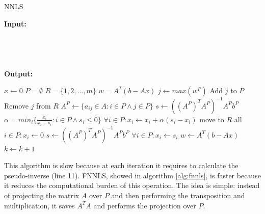 \begin{algorithm}[h]
  \begin{flushleft}
  \caption{NNLS}
  \label{alg:nnls}
  \textbf{Input:} \\
  \hspace*{\algorithmicindent} \\
  \hspace*{\algorithmicindent} \\
  \hspace*{\algorithmicindent}  \\
  \hspace*{\algorithmicindent}  \\
  \textbf{Output:} \\
  \hspace*{\algorithmicindent} 
  \end{flushleft}
  \begin{algorithmic}[1]
      \State $x \gets 0$
      \State $P=\emptyset$
      \State $R=\{ 1, 2, ..., m \}$
      \State $w=A^T(b - Ax)$ 
        \State $j \gets max(w^P)$ 
        \State Add $j$ to $P$
        \State Remove $j$ from $R$
        \State $A^P \gets  \{a_{ij} \in A : i \in P \land j \in P\}$
        \State $s \gets ((A^P)^T A^P)^{-1}A^P b^P$ 
          \State $\alpha=min_i\{\frac{x_i}{x_i-s_i} : i \in P \land s_i \leq 0 \}$
          \State $ \forall i \in P : x_i \gets x_i + \alpha (s_i - x_i)$
          \State move to $R$ all $i \in P : x_i \gets 0$
          \State $s \gets ((A^P)^T A^P)^{-1}A^P b^P$ 
          \EndWhile
        \State $\forall i \in P : x_i \gets s_i$
        \State $w \gets A^T(b - Ax)$
        \State $k \gets k+1$
      \EndWhile
    \EndFunction
  \end{algorithmic}
\end{algorithm}
This algorithm is slow because at each iteration it requires to calculate the pseudo-inverse (line 11). 
FNNLS, showed in algorithm \ref{alg:fnnls}, is faster because it reduces the computational burden of this operation. The idea is simple: instead of projecting the matrix $A$ over $P$ and then performing the transposition and multiplication, it saves $A^TA$ and performs the projection over $P$. 
